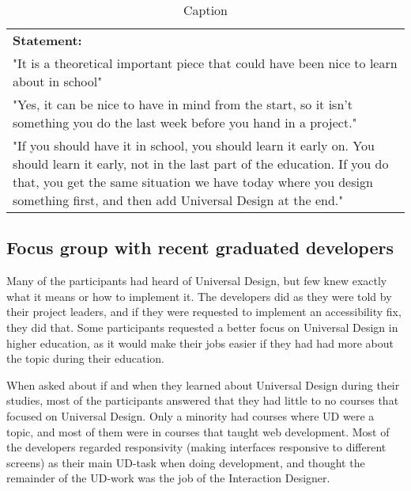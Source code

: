 \begin{table}[ht]
    \centering
    \caption{Caption}
    \begin{tabular}{p{12cm}}
        \rowcolor{gray!0!} \textbf{Statement:} \\
        "It is a theoretical important piece that could have been nice to learn about in school" \\
        
        "Yes, it can be nice to have in mind from the start, so it isn't something you do the last week before you hand in a project." \\
        
        "If you should have it in school, you should learn it early on. You should learn it early, not in the last part of the education. If you do that, you get the same situation we have today where you design something first, and then add Universal Design at the end."
    \end{tabular}
    
    \label{tab:my_label}
\end{table}



\iffalse
\subsection{Focus group with recent graduated developers} \label{focusgroupdevsres}
Many of the participants had heard of Universal Design, but few knew exactly what it means or how to implement it. The developers did as they were told by their project leaders, and if they were requested to implement an accessibility fix, they did that. Some participants requested a better focus on Universal Design in higher education, as it would make their jobs easier if they had had more about the topic during their education.

When asked about if and when they learned about Universal Design during their studies, most of the participants answered that they had little to no courses that focused on Universal Design. Only a minority had courses where UD were a topic, and most of them were in courses that taught web development. Most of the developers regarded responsivity (making interfaces responsive to different screens) as their main UD-task when doing development, and thought the remainder of the UD-work was the job of the Interaction Designer.
	

